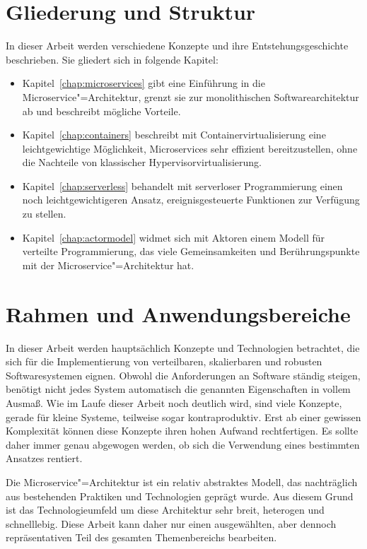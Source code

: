 \section{Gliederung und Struktur}

In dieser Arbeit werden verschiedene Konzepte und ihre Entstehungsgeschichte beschrieben. Sie gliedert sich in folgende Kapitel:

\begin{itemize}
	\item Kapitel~\ref{chap:microservices} gibt eine Einführung in die Microservice"=Architektur, grenzt sie zur monolithischen Softwarearchitektur ab und beschreibt mögliche Vorteile.
	\item Kapitel~\ref{chap:containers} beschreibt mit Containervirtualisierung eine leichtgewichtige Möglichkeit, Microservices sehr effizient bereitzustellen, ohne die Nachteile von klassischer Hypervisorvirtualisierung.
	\item Kapitel~\ref{chap:serverless} behandelt mit serverloser Programmierung einen noch leichtgewichtigeren Ansatz, ereignisgesteuerte Funktionen zur Verfügung zu stellen. 
	\item Kapitel~\ref{chap:actormodel} widmet sich mit Aktoren einem Modell für verteilte Programmierung, das viele Gemeinsamkeiten und Berührungspunkte mit der Microservice"=Architektur hat.
\end{itemize}

\section{Rahmen und Anwendungsbereiche}

In dieser Arbeit werden hauptsächlich Konzepte und Technologien betrachtet, die sich für die Implementierung von verteilbaren, skalierbaren und robusten Softwaresystemen eignen. Obwohl die Anforderungen an Software ständig steigen, benötigt nicht jedes System automatisch die genannten Eigenschaften in vollem Ausmaß. Wie im Laufe dieser Arbeit noch deutlich wird, sind viele Konzepte, gerade für kleine Systeme, teilweise sogar kontraproduktiv. Erst ab einer gewissen Komplexität können diese Konzepte ihren hohen Aufwand rechtfertigen. Es sollte daher immer genau abgewogen werden, ob sich die Verwendung eines bestimmten Ansatzes rentiert.

Die Microservice"=Architektur ist ein relativ abstraktes Modell, das nachträglich aus bestehenden Praktiken und Technologien geprägt wurde. Aus diesem Grund ist das Technologieumfeld um diese Architektur sehr breit, heterogen und schnelllebig. Diese Arbeit kann daher nur einen ausgewählten, aber dennoch repräsentativen Teil des gesamten Themenbereichs bearbeiten.

